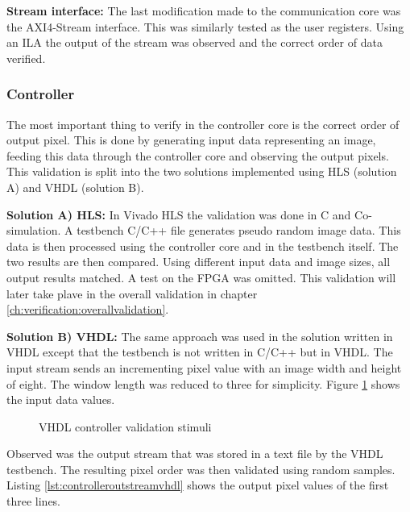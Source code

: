 \vspace{1ex}
\textbf{Stream interface:} The last modification made to the communication core
was the AXI4-Stream interface. This was similarly tested as the user registers.
Using an ILA the output of the stream was observed and the correct order of data
verified. 

\subsubsection*{Controller} 
The most important thing to verify in the controller core is the correct order
of output pixel. This is done by generating input data representing an image,
feeding this data through the controller core and observing the output pixels.
This validation is split into the two solutions implemented using HLS (solution
A) and VHDL (solution B).

\vspace{1ex}
\textbf{Solution A) HLS:} In Vivado HLS the validation was done in C and
Co-simulation. A testbench C/C++ file generates pseudo random image data. This
data is then processed using the controller core and in the testbench itself.
The two results are then compared. Using different input data and image sizes,
all output results matched. A test on the FPGA was omitted. This validation will
later take plave in the overall validation in chapter \ref{ch:verification:overallvalidation}.

\vspace{1ex}
\textbf{Solution B) VHDL:} The same approach was used in the solution written in
VHDL except that the testbench is not written in C/C++ but in VHDL. The input
stream sends an incrementing pixel value with an image width and height of
eight. The window length was reduced to three for simplicity. Figure 
\ref{fig:vhdlcontrollerstimuli} shows the input data values.

 \begin{figure}[h!]
    \centering
    \begin{adjustbox}{max width=\linewidth}
        
    \end{adjustbox}
    \caption{VHDL controller validation stimuli}
    \label{fig:vhdlcontrollerstimuli}
\end{figure}

Observed was the output stream that was stored in a text file by the VHDL
testbench. The resulting pixel order was then validated using random samples.
Listing \ref{lst:controlleroutstreamvhdl} shows the output pixel values of the
first three lines.


